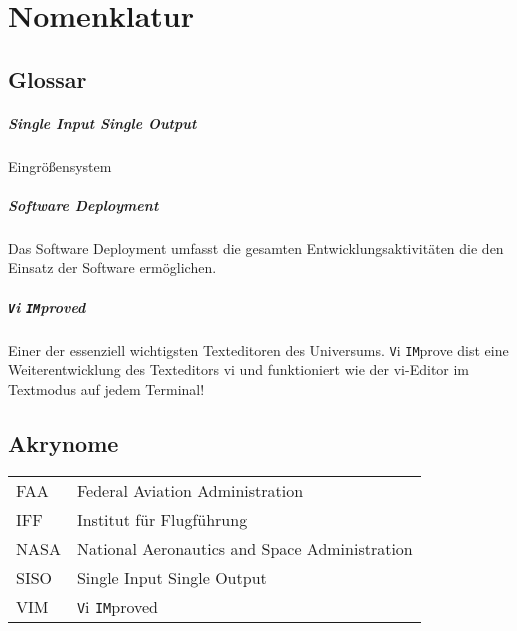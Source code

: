 %
\chapter*{Nomenklatur}
%
\section*{Glossar}
\paragraph{Single Input Single Output}
Eingrößensystem
\paragraph{Software Deployment}
Das Software Deployment umfasst die gesamten
Entwicklungsaktivitäten die den Einsatz der Software ermöglichen.
\paragraph{\texttt{V}i \texttt{IM}proved}
Einer der essenziell wichtigsten Texteditoren des Universums.
\texttt{V}i \texttt{IM}prove dist eine Weiterentwicklung des Texteditors
vi und funktioniert wie der vi-Editor im Textmodus auf jedem Terminal!
%
\section*{Akrynome}
\begin{longtable}{lp{13cm}}
	FAA & Federal Aviation Administration\\
	IFF & Institut für Flugführung\\
	NASA & National Aeronautics and Space Administration\\
	SISO & Single Input Single Output\\
	VIM & \texttt{V}i \texttt{IM}proved
\end{longtable}
%
